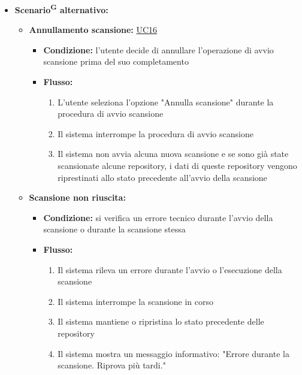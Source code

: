 \documentclass[a4paper, 11pt]{article}
\begin{document}
\begin{itemize}
\begin{enumerate}
		\item Il sistema avvia l'esecuzione dell'analisi sulle repository selezionate (\hyperref[UC17]{UC17 - Esegui analisi})
		\item Il sistema aggiorna lo stato delle repository sottoposte a scansione a "Scansione in corso"
		\item Al completamento della scansione, il sistema aggiorna le repository con i risultati dell'analisi e lo stato "Scansione completata"
	\end{enumerate}
	\item \textbf{Scenario\textsuperscript{G} alternativo:}
	\begin{itemize}
		\item \textbf{Annullamento scansione:} \hyperref[UC16]{UC16}
			\begin{itemize}
				\item \textbf{Condizione:} l'utente decide di annullare l'operazione di avvio scansione prima del suo completamento
				\item \textbf{Flusso:}
				\begin{enumerate}
					\item L'utente seleziona l'opzione "Annulla scansione" durante la procedura di avvio scansione
					\item Il sistema interrompe la procedura di avvio scansione
					\item Il sistema non avvia alcuna nuova scansione e se sono già state scansionate alcune repository, i dati di queste repository vengono riprestinati allo stato precedente all'avvio della scansione
				\end{enumerate}
			\end{itemize}
		\item \textbf{Scansione non riuscita:}
			\begin{itemize}
				\item \textbf{Condizione:} si verifica un errore tecnico durante l'avvio della scansione o durante la scansione stessa
				\item \textbf{Flusso:}
				\begin{enumerate}
					\item Il sistema rileva un errore durante l'avvio o l'esecuzione della scansione
					\item Il sistema interrompe la scansione in corso
					\item Il sistema mantiene o ripristina lo stato precedente delle repository
					\item Il sistema mostra un messaggio informativo: "Errore durante la scansione. Riprova più tardi."

\end{enumerate}
\end{itemize}
\end{itemize}
\end{itemize}
\end{document}
